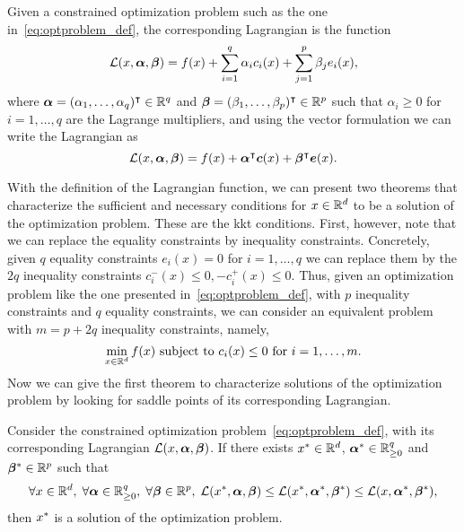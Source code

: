 \begin{definition}[Lagrangian]
    Given a constrained optimization problem such as the one in~\eqref{eq:optproblem_def}, the corresponding Lagrangian is the function 
    \begin{equation}
        \label{eq:lagr_def}
        \lagr(x, \fv{\alpha}, \fv{\beta}) = f(x) + \sum_{i=1}^q \alpha_i c_i(x) + \sum_{j=1}^p \beta_j e_i(x) ,
    \end{equation}
    where $\bm{\alpha} = (\alpha_1, \ldots, \alpha_q)^\intercal \in \mathbb{R}^q$ and $\bm{\beta} = (\beta_1, \ldots, \beta_p)^\intercal \in \mathbb{R}^p$ such that $\alpha_i \geq 0$ for $i=1, \ldots, q$ are the Lagrange multipliers, and using the vector formulation we can write the Lagrangian as 
    \begin{equation}
        \label{eq:lagr_defvec}
        \lagr(x, \fv{\alpha}, \fv{\beta}) = f(x) + \fv{\alpha}^\intercal \fv{c}(x) + \fv{\beta}^\intercal \fv{e}(x) .
    \end{equation}
\end{definition}
With the definition of the Lagrangian function, we can present two theorems that characterize the sufficient and necessary conditions for $x \in \mathbb{R}^d$ to be a solution of the optimization problem. These are the \acrfull{kkt} conditions.
%
First, however, note that we can replace the equality constraints by inequality constraints. Concretely, given $q$ equality constraints $e_i(x)=0$ for $i=1, \ldots, q$ we can replace them by the $2q$ inequality constraints 
$c_i^-(x) \leq 0, -c_i^+(x) \leq 0$.
%
Thus, given an optimization problem like the one presented in~\eqref{eq:optproblem_def}, with $p$ inequality constraints and $q$ equality constraints, we can consider an equivalent problem with $m = p + 2q$ inequality constraints, namely,
\begin{equation}
    \nonumber
    \min_{x \in \mathbb{R}^d} f(x) \text{ subject to } c_i(x) \leq 0 \text{ for } i=1, \ldots, m .
\end{equation}
%
Now we can give the first theorem to characterize solutions of the optimization problem by looking for saddle points of its corresponding Lagrangian.
\begin{theorem}\label{th:kkt_saddlepoint}
    Consider the constrained optimization problem~\eqref{eq:optproblem_def}, with its corresponding Lagrangian $\mathcal{L}(x, \bm{\alpha}, \bm{\beta})$. If there exists ${x}^* \in \mathbb{R}^d$, ${\bm{\alpha}}^* \in \mathbb{R}_{\geq 0}^q$ and ${\bm{\beta}}^* \in \mathbb{R}^p$ such that 
    \begin{equation}
        \label{eq:saddle_point}
        \forall x \in \reals^d,\;  \forall \fv{\alpha} \in \reals_{\geq 0}^q,\; \forall \fv{\beta} \in \reals^p,\; \lagr(\opt{x}, \fv{\alpha}, \fv{\beta}) \leq \lagr(\opt{x}, \opt{\fv{\alpha}}, \opt{\fv{\beta}}) \leq \lagr(x, \opt{\fv{\alpha}}, \opt{\fv{\beta}}),
    \end{equation}
    then ${x}^*$ is a solution of the optimization problem.
\end{theorem}
